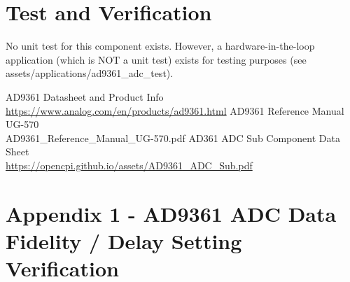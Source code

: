\documentclass{article}
\begin{document}
\pagebreak
\section*{Test and Verification}
No unit test for this component exists. However, a hardware-in-the-loop
application (which is NOT a unit test) exists for testing purposes (see
assets/applications/ad9361\_adc\_test).

\begin{thebibliography}{1}

 AD9361 Datasheet and Product Info \\
\url{
https://www.analog.com/en/products/ad9361.html}
 AD9361 Reference Manual UG-570\\
AD9361\_Reference\_Manual\_UG-570.pdf
 AD361 ADC Sub Component Data Sheet \\
\url{https://opencpi.github.io/assets/AD9361_ADC_Sub.pdf}

\end{thebibliography}
\pagebreak
\section{Appendix 1 - AD9361 ADC Data Fidelity / Delay Setting Verification}
\end{document}
